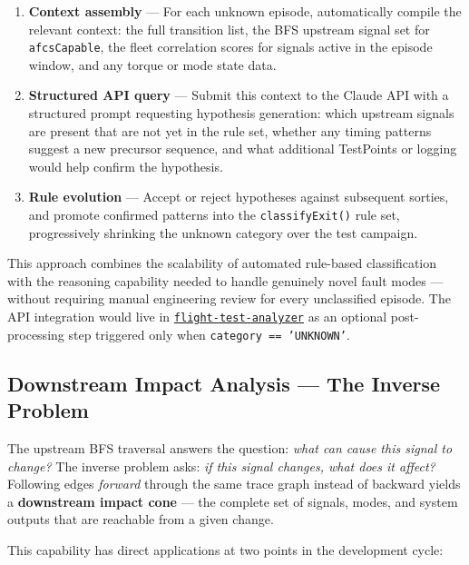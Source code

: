 \documentclass[11pt, letterpaper]{article}
\newcommand{\repoFTA}{\href{https://github.com/francis-barchesky/flight-test-analyzer}{\texttt{flight-test-analyzer}}}
\begin{document}
\begin{enumerate}[itemsep=3pt]
  \item \textbf{Context assembly} --- For each unknown episode, automatically
    compile the relevant context: the full transition list, the BFS upstream
    signal set for \texttt{afcsCapable}, the fleet correlation scores for
    signals active in the episode window, and any torque or mode state data.
  \item \textbf{Structured API query} --- Submit this context to the Claude API
    with a structured prompt requesting hypothesis generation: which upstream
    signals are present that are not yet in the rule set, whether any timing
    patterns suggest a new precursor sequence, and what additional TestPoints
    or logging would help confirm the hypothesis.
  \item \textbf{Rule evolution} --- Accept or reject hypotheses against
    subsequent sorties, and promote confirmed patterns into the
    \texttt{classifyExit()} rule set, progressively shrinking the unknown
    category over the test campaign.
\end{enumerate}

This approach combines the scalability of automated rule-based classification
with the reasoning capability needed to handle genuinely novel fault modes ---
without requiring manual engineering review for every unclassified episode.
The API integration would live in \repoFTA{} as an optional post-processing
step triggered only when \texttt{category == 'UNKNOWN'}.

\subsection*{Downstream Impact Analysis --- The Inverse Problem}
\label{sec:downstream}

The upstream BFS traversal answers the question: \emph{what can cause this
signal to change?} The inverse problem asks: \emph{if this signal changes,
what does it affect?} Following edges \emph{forward} through the same trace
graph instead of backward yields a \textbf{downstream impact cone} --- the
complete set of signals, modes, and system outputs that are reachable from a
given change.

This capability has direct applications at two points in the development cycle:
\end{document}
